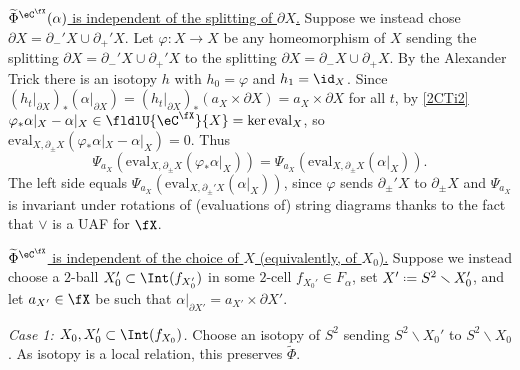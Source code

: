\documentclass[12pt,reqno]{amsart}
\newcounter{alpha}\renewcommand\thealpha{\upshape\Alph{alpha}}
\newcommand{\eval}{\mathrm{eval}}
\newcommand{\psn}{\Phi}
\newcommand{\C}{\eC}
\newcommand{\tld}[1]{{\widetilde{#1}}}
\newcommand{\itemstep}[1]{\smallskip\noindent\underline{#1}}
\renewcommand{\setminus}{\smallsetminus}
\DeclareRobustCommand{\coloneq}{\mathrel{\vcenter{\baselineskip0.5ex\lineskiplimit0pt\hbox{\scriptsize{\upshape.}}\hbox{\scriptsize{\upshape.}}}}=}
\begin{document}
\begin{pf}
\itemstep{$\tld\psn^{\C^\fX}(\alpha)$ is independent of the splitting of $\partial X$.}
Suppose we instead chose $\partial X=\partial_-'X\cup\partial_+'X$. Let $\varphi\colon X\to X$ be any homeomorphism of $X$ sending the splitting $\partial X=\partial_-'X\cup\partial_+'X$ to the splitting $\partial X=\partial_-X\cup\partial_+X$. By the Alexander Trick there is an isotopy $h$ with $h_0=\varphi$ and $h_1=\id_X$. Since $(h_t|_{\partial X})_*(\alpha|_{\partial X})=(h_t|_{\partial X})_*(a_X\times\partial X)=a_X\times\partial X$ for all $t$, by \ref{2CTi2} $\varphi_*\alpha|_X-\alpha|_X\in\fldlU{\C^\fX}{X}=\ker\eval_X$, so
$\eval_{X,\partial_\pm X}(\varphi_*\alpha|_X-\alpha|_X)=0$.
Thus
\[
  \Psi_{a_X}(\eval_{X,\partial_\pm X}(\varphi_*\alpha|_X))=\Psi_{a_X}(\eval_{X,\partial_\pm X}(\alpha|_X)).
\]
The left side equals $\Psi_{a_X}(\eval_{X,\partial_\pm'X}(\alpha|_X))$, since $\varphi$ sends $\partial_\pm'X$ to $\partial_\pm X$ and $\Psi_{a_X}$ is invariant under rotations of (evaluations of) string diagrams thanks to the fact that $\vee$ is a UAF for $\fX$. 

\itemstep{$\tld\psn^{\C^\fX}$ is independent of the choice of $X$ (equivalently, of $X_0$).}
Suppose we instead choose a $2$-ball $X_0'\subset\Int(f_{X_0'})$ in some $2$-cell $f_{X_0'}\in F_\alpha$, set $X'\coloneq S^2\setminus X_0'$, and let $a_{X'}\in\fX$ be such that $\alpha|_{\partial X'}=a_{X'}\times\partial X'$.

\emph{Case 1: $X_0,X_0'\subset\Int(f_{X_0})$.} Choose an isotopy of $S^2$ sending $S^2\setminus X_0'$ to $S^2\setminus X_0$. As isotopy is a local relation, this preserves $\tld\psn$.


\end{pf}
\end{document}
